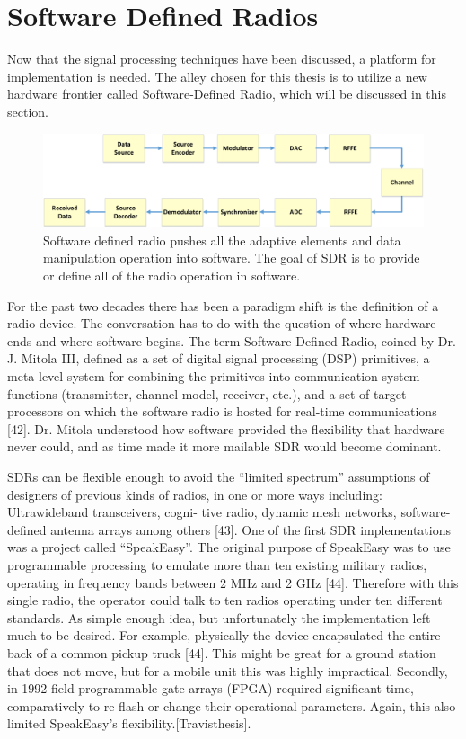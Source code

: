 \section{Software Defined Radios}
Now that the signal processing techniques have been discussed, a platform for implementation is needed. The alley chosen for this thesis is to utilize a new hardware frontier
called Software-Defined Radio, which will be discussed in this section.

\begin{figure}[ht!]
	\centering
	\includegraphics[width=\textwidth,keepaspectratio]{images/Gill/figs/softwaredefinedradio.eps}
    \caption{Software defined radio pushes all the adaptive elements and data manipulation operation into software. The goal of SDR is to provide or define all of the radio operation in software.} 
\label{sdr}      
\end{figure}

For the past two decades there has been a paradigm shift is the definition of a radio device. The conversation has to do with the question of where hardware ends and where
software begins. The term Software Defined Radio, coined by Dr. J. Mitola III, defined as a set of digital signal processing (DSP) primitives, a meta-level system for combining
the primitives into communication system functions (transmitter, channel model, receiver, etc.), and a set of target processors on which the software radio is hosted for real-time
communications [42]. Dr. Mitola understood how software provided the flexibility that hardware never could, and as time made it more mailable SDR would become dominant.

SDRs can be flexible enough to avoid the “limited spectrum” assumptions of designers of previous kinds of radios, in one or more ways including: Ultrawideband transceivers, cogni-
tive radio, dynamic mesh networks, software-defined antenna arrays among others [43]. One of the first SDR implementations was a project called “SpeakEasy”. The original purpose of
SpeakEasy was to use programmable processing to emulate more than ten existing military radios, operating in frequency bands between 2 MHz and 2 GHz [44]. Therefore with this
single radio, the operator could talk to ten radios operating under ten different standards. As simple enough idea, but unfortunately the implementation left much to be desired. For
example, physically the device encapsulated the entire back of a common pickup truck [44]. This might be great for a ground station that does not move, but for a mobile unit this
was highly impractical. Secondly, in 1992 field programmable gate arrays (FPGA) required significant time, comparatively to re-flash or change their operational parameters. Again,
this also limited SpeakEasy’s flexibility.[Travisthesis].
